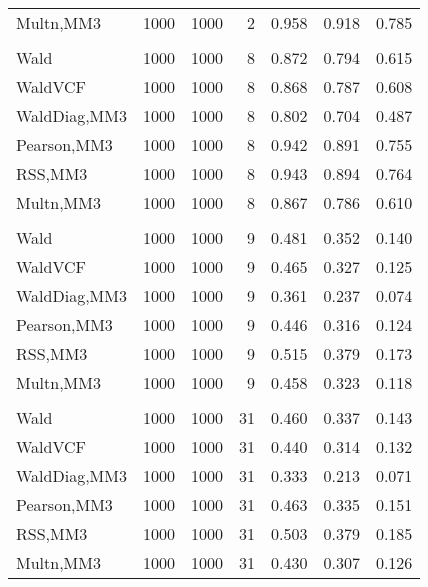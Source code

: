 \documentclass[
]{article}
\begin{document}
\begin{table}[H]
{\begin{tabular}[t]{lrrrrrr}
\hspace{1em}Multn,MM3 & 1000 & 1000 & 2 & 0.958 & 0.918 & 0.785\\
\addlinespace[0.3em]
\multicolumn{7}{l}{\textbf{1F 15V}}\\
\hspace{1em}Wald & 1000 & 1000 & 8 & 0.872 & 0.794 & 0.615\\
\hspace{1em}WaldVCF & 1000 & 1000 & 8 & 0.868 & 0.787 & 0.608\\
\hspace{1em}WaldDiag,MM3 & 1000 & 1000 & 8 & 0.802 & 0.704 & 0.487\\
\hspace{1em}Pearson,MM3 & 1000 & 1000 & 8 & 0.942 & 0.891 & 0.755\\
\hspace{1em}RSS,MM3 & 1000 & 1000 & 8 & 0.943 & 0.894 & 0.764\\
\hspace{1em}Multn,MM3 & 1000 & 1000 & 8 & 0.867 & 0.786 & 0.610\\
\addlinespace[0.3em]
\multicolumn{7}{l}{\textbf{2F 10V}}\\
\hspace{1em}Wald & 1000 & 1000 & 9 & 0.481 & 0.352 & 0.140\\
\hspace{1em}WaldVCF & 1000 & 1000 & 9 & 0.465 & 0.327 & 0.125\\
\hspace{1em}WaldDiag,MM3 & 1000 & 1000 & 9 & 0.361 & 0.237 & 0.074\\
\hspace{1em}Pearson,MM3 & 1000 & 1000 & 9 & 0.446 & 0.316 & 0.124\\
\hspace{1em}RSS,MM3 & 1000 & 1000 & 9 & 0.515 & 0.379 & 0.173\\
\hspace{1em}Multn,MM3 & 1000 & 1000 & 9 & 0.458 & 0.323 & 0.118\\
\addlinespace[0.3em]
\multicolumn{7}{l}{\textbf{3F 15V}}\\
\hspace{1em}Wald & 1000 & 1000 & 31 & 0.460 & 0.337 & 0.143\\
\hspace{1em}WaldVCF & 1000 & 1000 & 31 & 0.440 & 0.314 & 0.132\\
\hspace{1em}WaldDiag,MM3 & 1000 & 1000 & 31 & 0.333 & 0.213 & 0.071\\
\hspace{1em}Pearson,MM3 & 1000 & 1000 & 31 & 0.463 & 0.335 & 0.151\\
\hspace{1em}RSS,MM3 & 1000 & 1000 & 31 & 0.503 & 0.379 & 0.185\\
\hspace{1em}Multn,MM3 & 1000 & 1000 & 31 & 0.430 & 0.307 & 0.126\\
\bottomrule
\end{tabular}}
\endgroup{}
\end{table}
\end{document}
